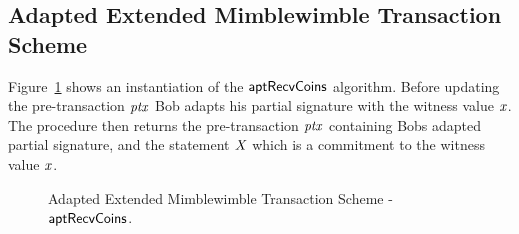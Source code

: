\subsection{Adapted Extended Mimblewimble Transaction Scheme}

Figure~\ref{fig:inst-apt-mw-tx-recv} shows an instantiation of the $\mathsf{aptRecvCoins}$ algorithm. Before updating the pre-transaction $\mathit{ptx}$ Bob adapts his partial signature with the witness value $\mathit{x}$. The procedure
then returns the pre-transaction $\mathit{ptx}$ containing Bobs adapted partial signature, and the statement $\mathit{X}$ which is a commitment to the witness value $\mathit{x}$.

\begin{figure}
    \begin{center}
    \end{center}
    \caption{Adapted Extended Mimblewimble Transaction Scheme - $\mathsf{aptRecvCoins}$. \label{fig:inst-apt-mw-tx-recv}}
\end{figure}

